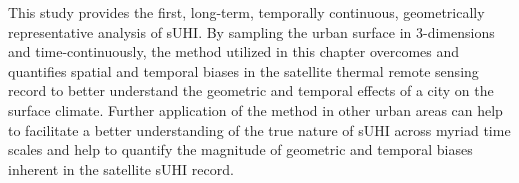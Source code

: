 \begin{bibunit}
This study provides the first, long-term, temporally continuous, geometrically representative analysis of sUHI. By sampling the urban surface in 3-dimensions and time-continuously, the method utilized in this chapter overcomes and quantifies spatial and temporal biases in the satellite thermal remote sensing record to better understand the geometric and temporal effects of a city on the surface climate. Further application of the method in other urban areas can help to facilitate a better understanding of the true nature of sUHI across myriad time scales and help to quantify the magnitude of geometric and temporal biases inherent in the satellite sUHI record.

\cleardoublepage 
{}  
\renewcommand*{\bibname}{References}


\putbib
\end{bibunit}